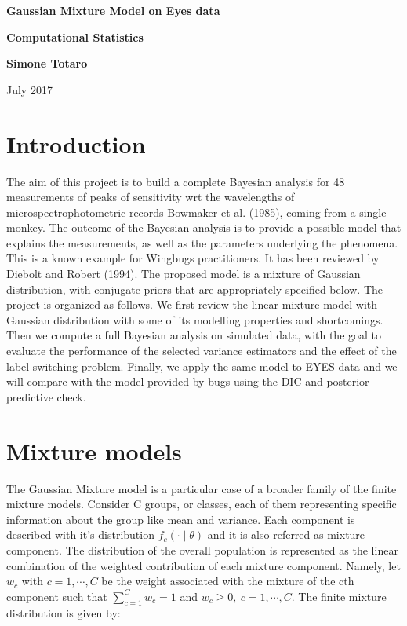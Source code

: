 \documentclass{article}
\begin{document}
\newcommand{\vect}[1]{\boldsymbol{#1}}
\begin{titlepage}

    \begin{center}
       \vspace*{1cm}
        
        \Huge
        \textbf{Gaussian Mixture Model on Eyes data}
        
        \vspace{0.5cm}
        \LARGE
        \textbf{Computational Statistics}
        
        \vspace{1.5cm}
        
        \textbf{Simone Totaro}
        
        \vfill
        
        July 2017
        
        \vspace{0.8cm}
    
    \end{center}
\end{titlepage}
\section{Introduction}
The aim of this project is to build a complete Bayesian analysis for 48 measurements of peaks of sensitivity wrt the wavelengths of microspectrophotometric records Bowmaker et al. (1985), coming from a single monkey. The outcome of the Bayesian analysis is to provide a possible model that explains the measurements, as well as the parameters underlying the phenomena. This is a known example for Wingbugs practitioners. It has been reviewed by Diebolt and Robert (1994). The proposed model is a mixture of Gaussian distribution, with conjugate priors that are appropriately specified below. The project is organized as follows. We first review the linear mixture model with Gaussian distribution with some of its modelling properties and shortcomings. Then we compute a full Bayesian analysis on simulated data, with the goal to evaluate the performance of the selected variance estimators and the effect of the label switching problem. Finally, we apply the same model to EYES data and we will compare with the model provided by bugs using the DIC and posterior predictive check. 

\section{Mixture models}
The Gaussian Mixture model is a particular case of a broader family of the finite mixture models. Consider C groups, or classes, each of them representing specific information about the group like mean and variance. Each component is described with it's distribution $f_c(\cdot \mid \theta)$ and it is also referred as mixture component. The distribution of the overall population is represented as the linear combination of the weighted contribution of each mixture component. Namely, let $w_c$ with $c = 1, \cdots ,C$ be the weight associated with the mixture of the cth component such that $\sum_{c = 1}^{C} w_c = 1$ and $w_c \geq 0,  \ c  = 1,\cdots,C$. The finite mixture distribution is given by:
\end{document}
